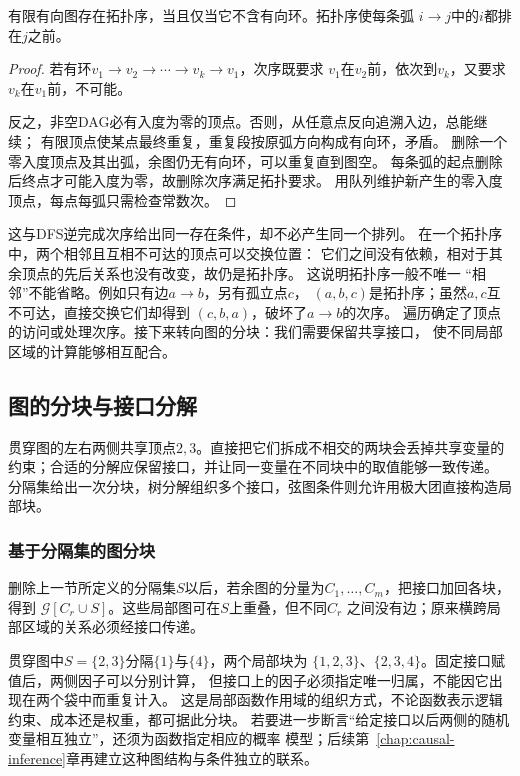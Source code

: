 \begin{theorem}[DAG的拓扑排序]
  \label{thm:graph-theory-topological-order}
  有限有向图存在拓扑序，当且仅当它不含有向环。拓扑序使每条弧
  \(i\to j\)中的\(i\)都排在\(j\)之前。
\end{theorem}

\begin{proof}
若有环\(v_1\to v_2\to\cdots\to v_k\to v_1\)，次序既要求
\(v_1\)在\(v_2\)前，依次到\(v_k\)，又要求\(v_k\)在\(v_1\)前，不可能。

反之，非空DAG必有入度为零的顶点。否则，从任意点反向追溯入边，总能继续；
有限顶点使某点最终重复，重复段按原弧方向构成有向环，矛盾。
删除一个零入度顶点及其出弧，余图仍无有向环，可以重复直到图空。
每条弧的起点删除后终点才可能入度为零，故删除次序满足拓扑要求。
用队列维护新产生的零入度顶点，每点每弧只需检查常数次。
\end{proof}

这与DFS逆完成次序给出同一存在条件，却不必产生同一个排列。
在一个拓扑序中，两个相邻且互相不可达的顶点可以交换位置：
它们之间没有依赖，相对于其余顶点的先后关系也没有改变，故仍是拓扑序。
这说明拓扑序一般不唯一
“相邻”不能省略。例如只有边\(a\to b\)，另有孤立点\(c\)，
\((a,b,c)\)是拓扑序；虽然\(a,c\)互不可达，直接交换它们却得到
\((c,b,a)\)，破坏了\(a\to b\)的次序。
遍历确定了顶点的访问或处理次序。接下来转向图的分块：我们需要保留共享接口，
使不同局部区域的计算能够相互配合。

\subsection{图的分块与接口分解}

贯穿图的左右两侧共享顶点\(2,3\)。直接把它们拆成不相交的两块会丢掉共享变量的
约束；合适的分解应保留接口，并让同一变量在不同块中的取值能够一致传递。
分隔集给出一次分块，树分解组织多个接口，弦图条件则允许用极大团直接构造局部块。

\subsubsection{基于分隔集的图分块}
\label{sec:graph-theory-separators}

删除上一节所定义的分隔集\(S\)以后，若余图的分量为\(C_1,\ldots,C_m\)，把接口加回各块，得到
\(\mathcal G[C_r\cup S]\)。这些局部图可在\(S\)上重叠，但不同\(C_r\)
之间没有边；原来横跨局部区域的关系必须经接口传递。

贯穿图中\(S=\{2,3\}\)分隔\(\{1\}\)与\(\{4\}\)，两个局部块为
\(\{1,2,3\}\)、\(\{2,3,4\}\)。固定接口赋值后，两侧因子可以分别计算，
但接口上的因子必须指定唯一归属，不能因它出现在两个袋中而重复计入。
这是局部函数作用域的组织方式，不论函数表示逻辑约束、成本还是权重，都可据此分块。
若要进一步断言“给定接口以后两侧的随机变量相互独立”，还须为函数指定相应的概率
模型；后续第~\ref{chap:causal-inference}章再建立这种图结构与条件独立的联系。

